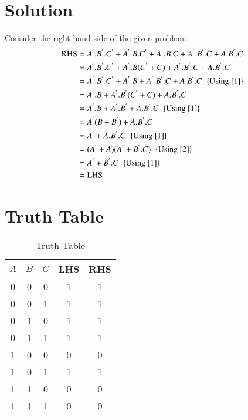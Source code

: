 \documentclass[journal,12pt]{IEEEtran}
\begin{document}
\section{\textbf{Solution}}
Consider the right hand side of the given problem:
\begin{align}
 \text{RHS}
 &=A^{'}.B^{'}.C^{'}+A^{'}.B.C^{'}+A^{'}.B.C+A^{'}.B^{'}.C+A.B^{'}.C \\
 &=A^{'}.B^{'}.C^{'}+A^{'}.B(C^{'}+C)+A^{'}.B^{'}.C+A.B^{'}.C \\
 &=A^{'}.B^{'}.C^{'}+A^{'}.B+A^{'}.B^{'}.C+A.B^{'}.C\hspace{0.2cm}\{\text{Using \eqref{1}}\}\\
 &=A^{'}.B+A^{'}.B^{'}(C^{'}+C)+A.B^{'}.C\\
 &=A^{'}.B+A^{'}.B^{'}+A.B^{'}.C\hspace{0.2cm}\{\text{Using \eqref{1}}\}\\
 &=A^{'}(B+B^{'})+A.B^{'}.C\\
 &=A^{'}+A.B^{'}.C\hspace{0.2cm}\{\text{Using \eqref{1}}\}\\
 &=(A^{'}+A)(A^{'}+B^{'}.C)\hspace{0.2cm}\{\text{Using \eqref{2}}\}\\
 &=A^{'}+B^{'}.C\hspace{0.2cm}\{\text{Using \eqref{1}}\}\\
 &=\text{LHS}\nonumber
\end{align}
\section{\textbf{Truth Table}}
\begin{table}[h]
    \centering
    \begin{tabular}{|c|c|c|c|c|}
    \hline
    $A$&$B$&$C$&LHS&RHS  \\
    \hline
    0&0&0&1&1\\
    0&0&1&1&1\\
    0&1&0&1&1\\
    0&1&1&1&1\\
    1&0&0&0&0\\
    1&0&1&1&1\\
    1&1&0&0&0\\
    1&1&1&0&0\\
    \hline
    \end{tabular}
    \caption{Truth Table}
\end{table}
\end{document}
